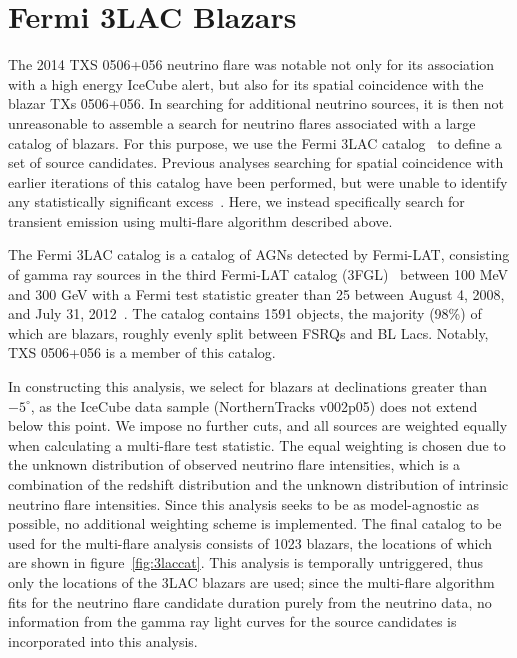 \section{Fermi 3LAC Blazars}
The 2014 TXS 0506+056 neutrino flare was notable not only for its association with a high energy IceCube alert, but also for its spatial coincidence with the blazar TXs 0506+056. In searching for additional neutrino sources, it is then not unreasonable to assemble a search for neutrino flares associated with a large catalog of blazars. For this purpose, we use the Fermi 3LAC catalog~\cite{fermi_3lac} to define a set of source candidates. Previous analyses searching for spatial coincidence with earlier iterations of this catalog have been performed, but were unable to identify any statistically significant excess~\cite{2lac_ic}. Here, we instead specifically search for transient emission using multi-flare algorithm described above. 

The Fermi 3LAC catalog is a catalog of AGNs detected by Fermi-LAT, consisting of gamma ray sources in the third Fermi-LAT catalog (3FGL)~\cite{fermi3fgl} between 100 MeV and 300 GeV with a Fermi test statistic greater than 25 between August 4, 2008, and July 31, 2012~\cite{fermi_3lac}. The catalog contains 1591 objects, the majority (98\%) of which are blazars, roughly evenly split between FSRQs and BL Lacs. Notably, TXS 0506+056 is a member of this catalog. 

In constructing this analysis, we select for blazars at declinations greater than $-5^{\circ}$, as the IceCube data sample (NorthernTracks v002p05) does not extend below this point. We impose no further cuts, and all sources are weighted equally when calculating a multi-flare test statistic. The equal weighting is chosen due to the unknown distribution of observed neutrino flare intensities, which is a combination of the redshift distribution and the unknown distribution of intrinsic neutrino flare intensities. Since this analysis seeks to be as model-agnostic as possible, no additional weighting scheme is implemented. The final catalog to be used for the multi-flare analysis consists of 1023 blazars, the locations of which are shown in figure~\ref{fig:3laccat}. This analysis is temporally untriggered, thus only the locations of the 3LAC blazars are used; since the multi-flare algorithm fits for the neutrino flare candidate duration purely from the neutrino data, no information from the gamma ray light curves for the source candidates is incorporated into this analysis. 

